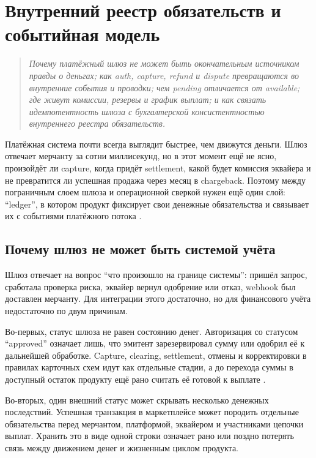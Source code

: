 
\chapter{Внутренний реестр обязательств и событийная модель}
\label{ch:internal-ledger}
\begin{quote}
  \itshape
  Почему платёжный шлюз не может быть окончательным источником
  правды о деньгах; как auth, capture, refund и dispute превращаются
  во внутренние события и проводки; чем pending отличается от available;
  где живут комиссии, резервы и график выплат; и как связать
  идемпотентность шлюза с бухгалтерской консистентностью внутреннего
  реестра обязательств.
\end{quote}

Платёжная система почти всегда выглядит быстрее, чем движутся деньги.
Шлюз отвечает мерчанту за сотни миллисекунд, но в этот момент ещё
не ясно, произойдёт ли capture, когда придёт settlement, какой будет
комиссия эквайера и не превратится ли успешная продажа через месяц
в chargeback. Поэтому между пограничным слоем шлюза и операционной
сверкой нужен ещё один слой: 
\enquote{ledger}, в котором продукт фиксирует свои денежные
обязательства и связывает их с событиями платёжного потока
\cite{visa-core-rules,mc-tpr,stripe-manual-capture}.

\section{Почему шлюз не может быть системой учёта}
\label{sec:ledger-why}

Шлюз отвечает на вопрос \enquote{что произошло на границе системы}:
пришёл запрос, сработала проверка риска, эквайер вернул одобрение
или отказ, webhook был доставлен мерчанту. Для интеграции этого достаточно,
но для финансового учёта недостаточно по двум причинам.

Во-первых, статус шлюза не равен состоянию денег. Авторизация
со статусом \enquote{approved} означает лишь, что эмитент зарезервировал сумму
или одобрил её к дальнейшей обработке. Capture, clearing, settlement,
отмены и корректировки в правилах карточных схем идут как отдельные стадии, а до
перехода суммы в доступный остаток продукту ещё рано считать её
готовой к выплате \cite{visa-core-rules,mc-tpr,stripe-manual-capture,stripe-balances}.

Во-вторых, один внешний статус может скрывать несколько денежных
последствий. Успешная транзакция в маркетплейсе может породить
отдельные обязательства перед мерчантом, платформой, эквайером
и участниками цепочки выплат. Хранить это в виде одной строки
 означает рано или поздно
потерять связь между движением денег и жизненным циклом продукта.

